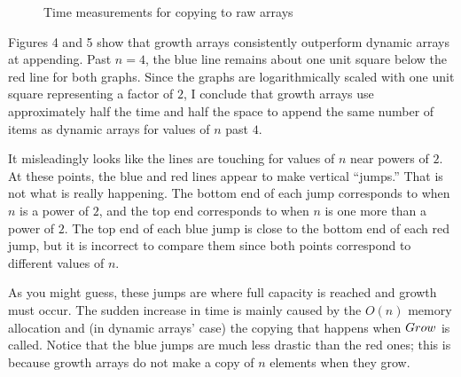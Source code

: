 \begin{figure}[H]
	\begin{minipage}{\textwidth}
		\label{plot:5}
		\caption{Time measurements for copying to raw arrays}
	\end{minipage}
\end{figure}

Figures 4 and 5 show that growth arrays consistently outperform dynamic arrays at appending. Past $n = 4$, the blue line remains about one unit square below the red line for both graphs. Since the graphs are logarithmically scaled with one unit square representing a factor of $2$, I conclude that growth arrays use approximately half the time and half the space to append the same number of items as dynamic arrays for values of $n$ past $4$.

It misleadingly looks like the lines are touching for values of $n$ near powers of $2$. At these points, the blue and red lines appear to make vertical ``jumps.'' That is not what is really happening. The bottom end of each jump corresponds to when $n$ is a power of $2$, and the top end corresponds to when $n$ is one more than a power of $2$. The top end of each blue jump is close to the bottom end of each red jump, but it is incorrect to compare them since both points correspond to different values of $n$.

As you might guess, these jumps are where full capacity is reached and growth must occur. The sudden increase in time is mainly caused by the $O(n)$ memory allocation and (in dynamic arrays' case) the copying that happens when $Grow$ is called. Notice that the blue jumps are much less drastic than the red ones; this is because growth arrays do not make a copy of $n$ elements when they grow.

